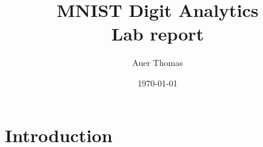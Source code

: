 \documentclass[12pt]{report}
\title{MNIST Digit Analytics\\Lab report}
\author{Auer Thomas}
\date{\today}
\begin{document}
    \maketitle

    \tableofcontents

    \chapter{Introduction}


    
    
    
\end{document}
